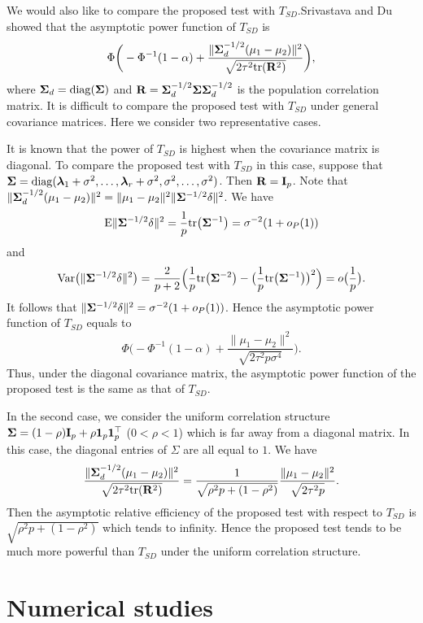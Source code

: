 \documentclass[times,sort&compress,3p]{elsarticle}
\newcommand{\mytr}{ {\rm tr} }
\newcommand{\mydiag}{ {\rm diag} }
\newcommand{\myE}{ {\rm E} }
\newcommand{\myVar}{ {\rm Var} }
\newcommand{\bfsym}[1]{\ensuremath{\boldsymbol{#1}}}
\def\blambda {\bfsym {\lambda}}        \def\bLambda {\bfsym {\Lambda}}
\theoremstyle{plain}
\theoremstyle{definition}
\theoremstyle{remark}
\begin{document}
 We would also like to compare the proposed test with $T_{SD}$.Srivastava and Du~\cite{Srivastava2008A} showed that the asymptotic power function of $T_{SD}$ is
 $$
        \Phi\bigg(-\Phi^{-1}(1-\alpha)+\frac{\|\bSigma_d^{-1/2}(\mu_1-\mu_2)\|^2}{\sqrt{2\tau^2\mytr(\BR^2)}}\bigg),
 $$
 where $\bSigma_d=\mydiag(\bSigma)$ and $\BR=\bSigma_d^{-1/2} \bSigma \bSigma_d^{-1/2}$ is the population correlation matrix.
 It is difficult to compare the proposed test with $T_{SD}$ under general covariance matrices.
 Here we consider two representative cases.


 It is known that the power of $T_{SD}$ is highest when the covariance matrix is diagonal.
 To compare the proposed test with $T_{SD}$ in this case,
suppose that $\bSigma=\mydiag(\blambda_1+\sigma^2,\ldots,\blambda_r+\sigma^2,\sigma^2,\ldots,\sigma^2)$. Then $\mathbf{R}=\mathbf{I}_p$.
 Note that $\|\bSigma_d^{-1/2}(\mu_1-\mu_2)\|^2=\|\mu_1-\mu_2\|^2 \|\bSigma^{-1/2}\delta\|^2$.
 We have 
 $$\myE\|\bSigma^{-1/2}\delta\|^2=
 \frac{1}{p}\mytr\big(\bSigma^{-1}\big)
 =\sigma^{-2} (1+o_P(1))
 $$
and
 $$
 \myVar\big( \|\bSigma^{-1/2}\delta\|^2 \big)=\frac{2}{p+2}\Big(\frac{1}{p}\mytr\big(\bSigma^{-2}\big)-\big(\frac{1}{p}\mytr\big(\bSigma^{-1}\big)\big)^2\Big)=o\big(\frac{1}{p}\big).$$
It follows that $\|\bSigma^{-1/2}\delta\|^2=\sigma^{-2}(1+o_P(1))$. Hence the asymptotic power function of $T_{SD}$ equals to
 $$
        \Phi\bigg(-\Phi^{-1}(1-\alpha)+\frac{\|\mu_1-\mu_2\|^2}{\sqrt{2\tau^2 p\sigma^4}}\bigg).
 $$
 Thus, under the diagonal covariance matrix, the asymptotic power function of the proposed test is the same as that of $T_{SD}$.

In the second case, we consider the uniform correlation structure $\bSigma=(1-\rho)\BI_p+\rho \mathbf{1}_p\mathbf{1}_p^\top $ ($0<\rho <1$) which is far away from a diagonal matrix.
 In this case, the diagonal entries of $\Sigma$ are all equal to $1$. 
 We have
 $$
 \frac{\|\bSigma_d^{-1/2}(\mu_1-\mu_2)\|^2}{\sqrt{2\tau^2\mytr(\BR^2)}}
 =
 \frac{1}{\sqrt{\rho^2 p +(1-\rho^2)}}\frac{\|\mu_1-\mu_2\|^2}{\sqrt{2\tau^2p}}.
 $$
 Then the asymptotic relative efficiency of the proposed test with respect to $T_{SD}$ is
 $\sqrt{\rho^2 p +(1-\rho^2)}$ which tends to infinity.
 Hence the proposed test tends to be much more powerful than $T_{SD}$ under the uniform correlation structure.






\section{Numerical studies}
\end{document}
